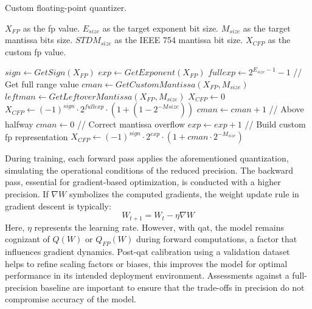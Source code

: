 \begin{algorithm}[h!]
	\caption{Custom floating-point quantizer.}
	\label{alg:quantizr}
	\begin{algorithmic}[1]
		\SetAlgoLined
		\renewcommand{\algorithmicrequire}{\textbf{input:}}
		\renewcommand{\algorithmicensure}{\textbf{output:}}
		\REQUIRE $X_{FP}$ as the \gls{fp} value.
		\REQUIRE $E_{size}$ as the target exponent bit size.
		\REQUIRE $M_{size}$ as the target mantissa bits size.
		\REQUIRE $STDM_{size}$ as the IEEE 754 mantissa bit size.
		\ENSURE $X_{CFP}$ as the custom \gls{fp} value.
		
		\STATE $sign \gets GetSign(X_{FP})$
		\STATE $exp \gets GetExponent(X_{FP})$
		\STATE $fullexp \gets 2^{E_{size}-1}-1$ // Get full range value
		\STATE $cman \gets GetCustomMantissa(X_{FP}, M_{size})$
		\STATE $leftman \gets GetLeftoverMantissa(X_{FP}, M_{size})$
		\STATE$X_{CFP}\gets0$
		\STATE$X_{CFP}\gets (-1)^{sign}\cdot2^{fullexp}\cdot(1+(1-2^{-M{size}}))$
		\ELSE
		\STATE $cman \gets cman+1$ // Above halfway
		\STATE $cman \gets 0$ // Correct mantissa overflow
		\STATE $exp \gets exp + 1$
		\ENDIF
		\ENDIF
		\STATE // Build custom \gls{fp} representation
		\STATE$X_{CFP}\gets (-1)^{sign}\cdot2^{exp}\cdot(1+cman\cdot2^{-M_{size}})$
		\ENDIF
	\end{algorithmic}
\end{algorithm}

During training, each forward pass applies the aforementioned quantization, simulating the operational conditions of the reduced precision. The backward pass, essential for gradient-based optimization, is conducted with a higher precision. If \( \nabla W \) symbolizes the computed gradients, the weight update rule in gradient descent is typically:
\begin{equation}
W_{t+1} = W_t - \eta \nabla W
\end{equation}
Here, \( \eta \) represents the learning rate. However, with \gls{qat}, the model remains cognizant of \( Q(W) \) or \( Q_{FP}(W) \) during forward computations, a factor that influences gradient dynamics. Post-\gls{qat} calibration using a validation dataset helps to refine scaling factors or biases, this improves the model for optimal performance in its intended deployment environment. Assessments against a full-precision baseline are important to ensure that the trade-offs in precision do not compromise accuracy of the model.

